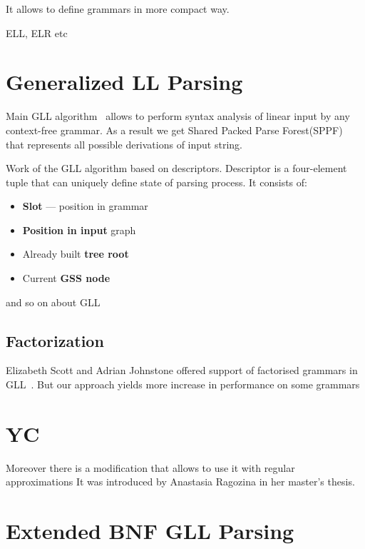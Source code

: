 \documentclass[runningheads,a4paper]{llncs}
\begin{document}
It allows to define grammars in more compact way.


ELL, ELR etc


\section{Generalized LL Parsing}%

Main GLL algorithm~\cite{scott2010gll} allows to perform syntax analysis of linear input by any context-free 
grammar. As a result we get Shared Packed Parse Forest(SPPF)~\cite{SPPF} that represents all possible derivations of input string.

Work of the GLL algorithm based on descriptors. Descriptor is a four-element tuple that can uniquely define state 
of parsing process. It consists of:
\begin{itemize}
    \item \textbf{Slot} --- position in grammar
    \item \textbf{Position in input} graph
    \item Already built \textbf{tree root}
    \item Current \textbf{GSS node}
\end{itemize}

and so on about GLL

\subsection{Factorization}%

Elizabeth Scott and Adrian Johnstone offered support of factorised grammars in GLL~\cite{scott2016structuring}. 
But our approach yields more increase in performance on some grammars


\section{YC}
Moreover there is a modification that allows to use it with regular approximations It was introduced by 
Anastasia Ragozina in her master's thesis.


\section{Extended BNF GLL Parsing}%
\end{document}

